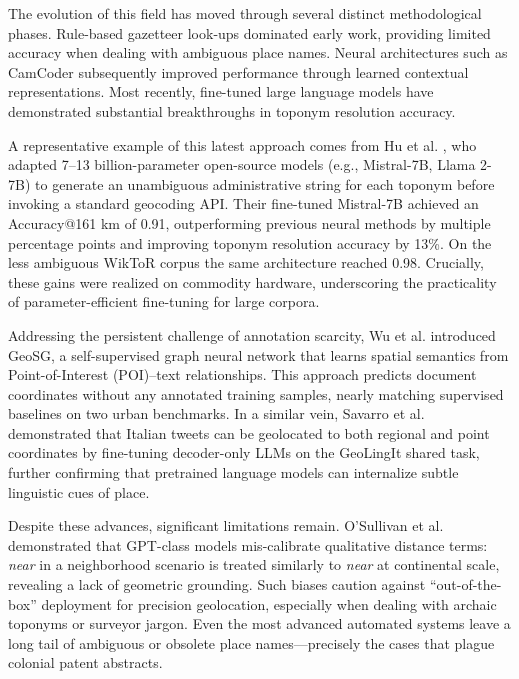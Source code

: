 The evolution of this field has moved through several distinct
methodological phases. Rule-based gazetteer look-ups dominated early
work, providing limited accuracy when dealing with ambiguous place
names. Neural architectures such as CamCoder \citep{Gritta2018_camcoder}
subsequently improved performance through learned contextual
representations. Most recently, fine-tuned large language models have
demonstrated substantial breakthroughs in toponym resolution accuracy.

A representative example of this latest approach comes from Hu et al.
\citep{Hu2024_toponym_llm}, who adapted 7--13 billion-parameter
open-source models (e.g., Mistral-7B, Llama 2-7B) to generate an
unambiguous administrative string for each toponym before invoking a
standard geocoding API. Their fine-tuned Mistral-7B achieved an
Accuracy@161 km of 0.91, outperforming previous neural methods by
multiple percentage points and improving toponym resolution accuracy by
13\%. On the less ambiguous WikToR corpus the same architecture reached
0.98. Crucially, these gains were realized on commodity hardware,
underscoring the practicality of parameter-efficient fine-tuning for
large corpora.

Addressing the persistent challenge of annotation scarcity, Wu et al.
\citep{wu2025geosg} introduced GeoSG, a self-supervised graph neural
network that learns spatial semantics from Point-of-Interest (POI)--text
relationships. This approach predicts document coordinates without any
annotated training samples, nearly matching supervised baselines on two
urban benchmarks. In a similar vein, Savarro et al.
\citep{savarro2024geolingit} demonstrated that Italian tweets can be
geolocated to both regional and point coordinates by fine-tuning
decoder-only LLMs on the GeoLingIt shared task, further confirming that
pretrained language models can internalize subtle linguistic cues of
place.

Despite these advances, significant limitations remain. O'Sullivan et
al. \citep{Osullivan2024_metric} demonstrated that GPT-class models
mis-calibrate qualitative distance terms: \emph{near} in a neighborhood
scenario is treated similarly to \emph{near} at continental scale,
revealing a lack of geometric grounding. Such biases caution against
``out-of-the-box'' deployment for precision geolocation, especially when
dealing with archaic toponyms or surveyor jargon. Even the most advanced
automated systems leave a long tail of ambiguous or obsolete place
names---precisely the cases that plague colonial patent abstracts.


